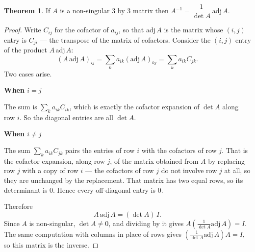 \documentclass[11pt,a4paper]{article}
\theoremstyle{definition}
\newtheorem{thm}{Theorem}[subsection]
\newcommand{\subhead}[1]{%
  \par\medskip\noindent\textbf{#1}\par\nobreak\smallskip}
\begin{document}
\begin{thm}\label{thm:adjoint-inverse}
If $A$ is a non-singular 3 by 3 matrix then
$A^{-1}=\dfrac{1}{\det A}\,\text{adj}\,A$.
\end{thm}

\begin{proof}
Write $C_{ij}$ for the cofactor of $a_{ij}$, so that $\text{adj}\,A$ is the
matrix whose $(i,j)$ entry is $C_{ji}$ --- the transpose of the matrix of
cofactors. Consider the $(i,j)$ entry of the product $A\,\text{adj}\,A$:
$$\left(A\,\text{adj}\,A\right)_{ij}=\sum_{k}a_{ik}\left(\text{adj}\,A\right)_{kj}
=\sum_{k}a_{ik}C_{jk}.$$
Two cases arise.

\subhead{When $i=j$} The sum is $\sum_k a_{ik}C_{ik}$, which is exactly the
cofactor expansion of $\det A$ along row $i$. So the diagonal entries are all
$\det A$.

\subhead{When $i\neq j$} The sum $\sum_k a_{ik}C_{jk}$ pairs the entries of row
$i$ with the cofactors of row $j$. That is the cofactor expansion, along row
$j$, of the matrix obtained from $A$ by replacing row $j$ with a copy of row
$i$ --- the cofactors of row $j$ do not involve row $j$ at all, so they are
unchanged by the replacement. That matrix has two equal rows, so its
determinant is $0$. Hence every off-diagonal entry is $0$.

Therefore
$$A\,\text{adj}\,A=(\det A)\,I.$$
Since $A$ is non-singular, $\det A\neq 0$, and dividing by it gives
$A\left(\frac{1}{\det A}\text{adj}\,A\right)=I$. The same computation with
columns in place of rows gives
$\left(\frac{1}{\det A}\text{adj}\,A\right)A=I$, so this matrix is the inverse.
\end{proof}
\end{document}
